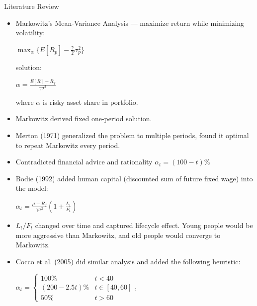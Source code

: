 \documentclass{beamer}
\begin{document}
\begin{frame}[allowframebreaks]{Literature Review}
  \begin{itemize}
	\item Markowitz's Mean-Variance Analysis --- maximize return while minimizing volatility:
\begin{center}
  $\displaystyle\max_{\alpha} \{ E[R_p] - \frac{\gamma}{2}\sigma^2_p \}$
\end{center}
solution:
\begin{center}
	$\alpha = \frac{E[R] - R_f}{\gamma\sigma^2}$
\end{center}
where $\alpha$ is risky asset share in portfolio.

	\item Markowitz derived fixed one-period solution.

\framebreak
	
	\item Merton (1971) generalized the problem to multiple periods, found it optimal to repeat Markowitz every period.
	
	\item Contradicted financial advice and rationality $\alpha_t = (100-t)\%$

	\item Bodie (1992) added human capital (discounted sum of future fixed wage) into the model:
  
\begin{center}
	$\alpha_t = \frac{\mu - R_f}{\gamma \sigma^2}\left(1+\frac{L_t}{F_t}\right)$
\end{center}

	\item $L_t/F_t$ changed over time and captured lifecycle effect. Young people would be more aggressive than Markowitz, and old people would converge to Markowitz.

\framebreak
	
	\item Cocco et al. (2005) did similar analysis and added the following heuristic:


\begin{center}
	$\alpha_t = \begin{cases} 100\% & t<40\\(200-2.5t)\% & t\in[40,60]\\50\% & t>60 \end{cases}$,
\end{center}


\end{itemize}
\end{frame}
\end{document}
